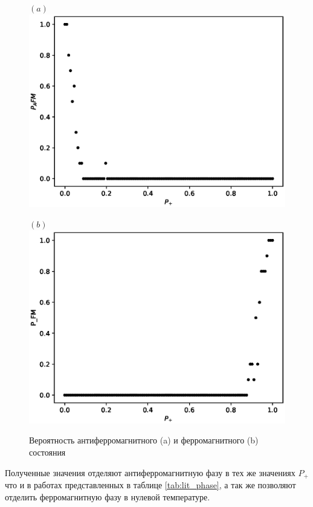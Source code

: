 \documentclass[utf8, babel, sor, jor, amsmath, amssymb, reprint]{elsarticle} %
\begin{document}
\begin{figure}[H]
	\begin{minipage}[h]{0.45\linewidth}
		\centering $(a)$
		\includegraphics[width=1\linewidth]{images/P_AFM_Mmax.eps}
	\end{minipage}
	\hfill
	\begin{minipage}[h]{0.45\linewidth}
		\centering $(b)$
		\includegraphics[width=1\linewidth]{images/P_FM_Mmax.eps}
	\end{minipage}
	\caption{Вероятность антиферромагнитного (a) и ферромагнитного (b) состояния}
	\label{fig:P_AFM_FM_Mmax}
\end{figure}

Полученные значения отделяют антиферромагнитную фазу в тех же значениях $P_+$ что и в работах представленных в таблице \ref{tab:lit_phase}, а так же позволяют отделить ферромагнитную фазу в нулевой температуре.
\end{document}

